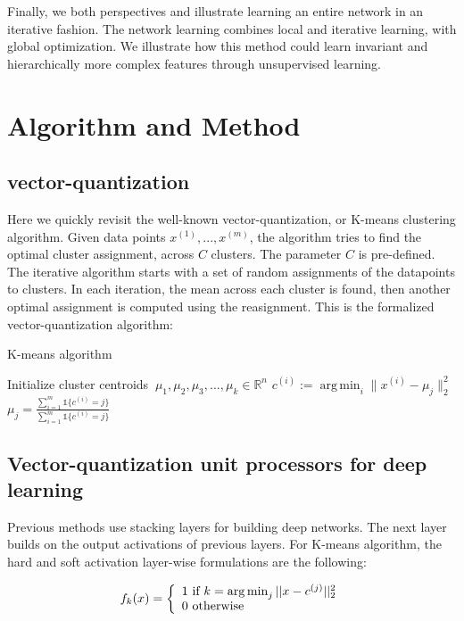 \documentclass{article}
\DeclareMathOperator*{\argmin}{arg\,min}
\begin{document}
Finally, we both perspectives and illustrate learning an entire network in 
an iterative fashion. The network learning combines local and iterative 
learning, with global optimization. We illustrate how this method could 
learn invariant and hierarchically more complex features through 
unsupervised learning. 

\section{Algorithm and Method} 
\subsection{vector-quantization} 
Here we quickly revisit the well-known vector-quantization, or K-means
clustering algorithm. Given data points $x^{(1)}, ..., x^{(m)}$, the
algorithm tries to find the optimal cluster assignment, across $C$
clusters. The parameter $C$ is pre-defined. The iterative algorithm
starts with a set of random assignments of the datapoints to
clusters. In each iteration, the mean across each cluster is found,
then another optimal assignment is computed using the
reasignment. This is the formalized vector-quantization algorithm:
\begin{algorithm} 
\caption{K-means algorithm} 
\label{algo1} 
\begin{algorithmic} 
\STATE Initialize cluster centroids $\: \mu_1, \mu_2, \mu_3,..., 
\mu_k \in \mathbb{R}^n$ 
        \STATE $c^{(i)} := \argmin_i \| x^{(i)} - \mu_j\|_2^2$ 
    \ENDFOR 
        \STATE $\mu_j = \frac{\sum_{i=1}^m \mathds{1}\{c^{(i)}=j\}}{\sum_{i=1}^m \mathds{1}\{c^{(i)}=j\}}$ 
    \ENDFOR 
\ENDWHILE 
\end{algorithmic} 
\end{algorithm} 

\subsection{Vector-quantization unit processors for deep learning} 
Previous methods use stacking layers for building deep networks. 
The next layer builds on the output activations of previous layers. For K-means 
algorithm, the hard and soft activation layer-wise formulations are the following: 

\begin{equation} 
f_k(x)=
\left\{ 
\begin{array}{l l} 
1 \text{ if } k = \argmin_j || x - c^{(j)} ||_2^2 \\ 
0 \text{ otherwise} 
\end{array}\right.
\end{equation} 
\end{document}

